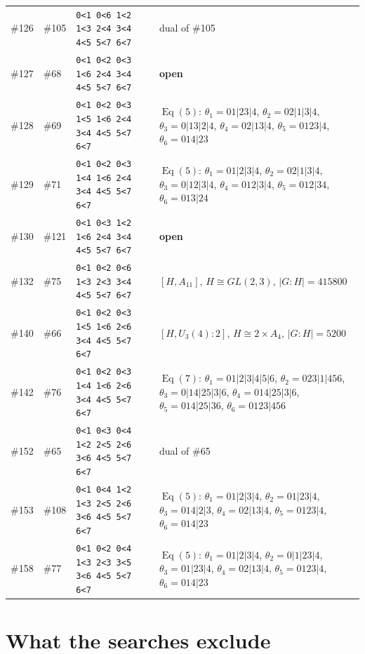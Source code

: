 \documentclass[11pt]{article}
\theoremstyle{remark}
\newcommand{\Eq}{\operatorname{Eq}}
\begin{document}
{\begin{longtable}{@{}l l p{4.9cm} p{7.4cm}@{}}
\#126 & \#105 & \texttt{0<1 0<6 1<2 1<3 2<4 3<4 4<5 5<7 6<7} & dual of \#105\\
\#127 & \#68 & \texttt{0<1 0<2 0<3 1<6 2<4 3<4 4<5 5<7 6<7} & \textbf{open}\\
\#128 & \#69 & \texttt{0<1 0<2 0<3 1<5 1<6 2<4 3<4 4<5 5<7 6<7} & $\Eq(5)$: $\theta_1=01|23|4$, $\theta_2=02|1|3|4$, $\theta_3=0|13|2|4$, $\theta_4=02|13|4$, $\theta_5=0123|4$, $\theta_6=014|23$\\
\#129 & \#71 & \texttt{0<1 0<2 0<3 1<4 1<6 2<4 3<4 4<5 5<7 6<7} & $\Eq(5)$: $\theta_1=01|2|3|4$, $\theta_2=02|1|3|4$, $\theta_3=0|12|3|4$, $\theta_4=012|3|4$, $\theta_5=012|34$, $\theta_6=013|24$\\
\#130 & \#121 & \texttt{0<1 0<3 1<2 1<6 2<4 3<4 4<5 5<7 6<7} & \textbf{open}\\
\#132 & \#75 & \texttt{0<1 0<2 0<6 1<3 2<3 3<4 4<5 5<7 6<7} & $[H,A_{11}]$, $H\cong GL(2,3)$, $|G:H|=415800$\\
\#140 & \#66 & \texttt{0<1 0<2 0<3 1<5 1<6 2<6 3<4 4<5 5<7 6<7} & $[H,U_3(4){:}2]$, $H\cong 2\times A_{4}$, $|G:H|=5200$\\
\#142 & \#76 & \texttt{0<1 0<2 0<3 1<4 1<6 2<6 3<4 4<5 5<7 6<7} & $\Eq(7)$: $\theta_1=01|2|3|4|5|6$, $\theta_2=023|1|456$, $\theta_3=0|14|25|3|6$, $\theta_4=014|25|3|6$, $\theta_5=014|25|36$, $\theta_6=0123|456$\\
\#152 & \#65 & \texttt{0<1 0<3 0<4 1<2 2<5 2<6 3<6 4<5 5<7 6<7} & dual of \#65\\
\#153 & \#108 & \texttt{0<1 0<4 1<2 1<3 2<5 2<6 3<6 4<5 5<7 6<7} & $\Eq(5)$: $\theta_1=01|2|3|4$, $\theta_2=01|23|4$, $\theta_3=014|2|3$, $\theta_4=02|13|4$, $\theta_5=0123|4$, $\theta_6=014|23$\\
\#158 & \#77 & \texttt{0<1 0<2 0<4 1<3 2<3 3<5 3<6 4<5 5<7 6<7} & $\Eq(5)$: $\theta_1=01|2|3|4$, $\theta_2=0|1|23|4$, $\theta_3=01|23|4$, $\theta_4=02|13|4$, $\theta_5=0123|4$, $\theta_6=014|23$\\
\bottomrule
\end{longtable}
}

\section{What the searches exclude}\label{sec:neg}
\end{document}

